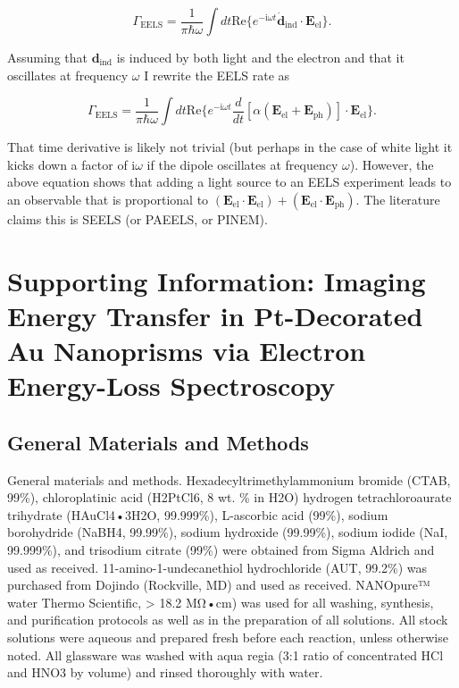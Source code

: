 \documentclass [11pt, proquest] {uwthesis}[2016/11/22]
\begin{document}
\begin{equation}
\Gamma_{\textrm{EELS}} = \frac{1}{\pi\hbar\omega} \int dt \textrm{Re}\{e^{-\textrm{i}\omega t} \dot{\textbf{d}}_{\textrm{ind}} \cdot \textbf{E}_{\textrm{el}} \} .
\label{eels_1}
\end{equation}

Assuming that $\textbf{d}_{\textrm{ind}}$ is induced by both light and the electron and that it oscillates at frequency $\omega$ I rewrite the EELS rate as

\begin{equation}
\Gamma_{\textrm{EELS}} = \frac{1}{\pi\hbar\omega} \int dt \textrm{Re}\{e^{-\textrm{i}\omega t} \frac{d}{dt}[\alpha(\textbf{E}_\textrm{el} + \textbf{E}_{\textrm{ph}})] \cdot \textbf{E}_{\textrm{el}} \}.
\label{eels_2}
\end{equation}

That time derivative is likely not trivial (but perhaps in the case of white light it kicks down a factor of $\textrm{i}\omega$ if the dipole oscillates at frequency $\omega$). However, the above equation shows that adding a light source to an EELS experiment leads to an observable that is proportional to $(\textbf{E}_{\textrm{el}}\cdot\textbf{E}_{\textrm{el}})+(\textbf{E}_{\textrm{el}}\cdot\textbf{E}_{\textrm{ph}})$. The literature claims this is SEELS (or PAEELS, or PINEM).

%
%
\nocite{*}   %


%
%
\appendix
\raggedbottom\sloppy
 
\chapter{Supporting Information: Imaging Energy Transfer in Pt-Decorated Au Nanoprisms via Electron Energy-Loss Spectroscopy}

\section{General Materials and Methods}

General materials and methods. Hexadecyltrimethylammonium bromide (CTAB, 99\%), chloroplatinic acid (H2PtCl6, 8 wt. \% in H2O) hydrogen tetrachloroaurate trihydrate (HAuCl4•3H2O, 99.999\%), L-ascorbic acid (99\%), sodium borohydride (NaBH4, 99.99\%), sodium hydroxide (99.99\%), sodium iodide (NaI, 99.999\%), and trisodium citrate (99\%) were obtained from Sigma Aldrich and used as received. 11-amino-1-undecanethiol hydrochloride (AUT, 99.2\%) was purchased from Dojindo (Rockville, MD) and used as received. NANOpure™ water Thermo Scientific, > 18.2 MΩ•cm) was used for all washing, synthesis, and purification protocols as well as in the preparation of all solutions. All stock solutions were aqueous and prepared fresh before each reaction, unless otherwise noted. All glassware was washed with aqua regia (3:1 ratio of concentrated HCl and HNO3 by volume) and rinsed thoroughly with water.
\end{document}
